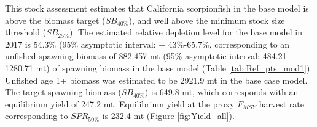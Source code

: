 \documentclass[12pt,]{article}
\begin{document}
This stock assessment estimates that California scorpionfish in the base
model is above the biomass target (\(SB_{40\%}\)), and well above the
minimum stock size threshold (\(SB_{25\%}\)). The estimated relative
depletion level for the base model in 2017 is 54.3\% (95\% asymptotic
interval: \(\pm\) 43\%-65.7\%, corresponding to an unfished spawning
biomass of 882.457 mt (95\% asymptotic interval: 484.21-1280.71 mt) of
spawning biomass in the base model (Table \ref{tab:Ref_pts_mod1}).
Unfished age 1+ biomass was estimated to be 2921.9 mt in the base case
model. The target spawning biomass (\(SB_{40\%}\)) is 649.8 mt, which
corresponds with an equilibrium yield of 247.2 mt. Equilibrium yield at
the proxy \(F_{MSY}\) harvest rate corresponding to \(SPR_{50\%}\) is
232.4 mt (Figure \ref{fig:Yield_all}).

\FloatBarrier
\end{document}
